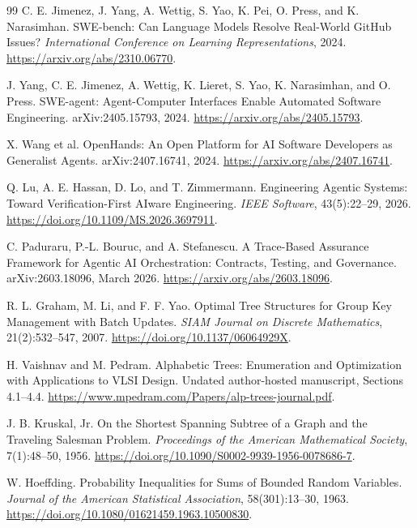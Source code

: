 \documentclass[10pt,journal,compsoc]{IEEEtran}
\theoremstyle{definition}\newtheorem{definition}[theorem]{Definition}
\begin{document}
\begin{thebibliography}{99}
\sloppy
{} C. E. Jimenez, J. Yang, A. Wettig, S. Yao, K. Pei, O. Press, and K. Narasimhan. SWE-bench: Can Language Models Resolve Real-World GitHub Issues? \emph{International Conference on Learning Representations}, 2024. \url{https://arxiv.org/abs/2310.06770}.

 J. Yang, C. E. Jimenez, A. Wettig, K. Lieret, S. Yao, K. Narasimhan, and O. Press. SWE-agent: Agent-Computer Interfaces Enable Automated Software Engineering. arXiv:2405.15793, 2024. \url{https://arxiv.org/abs/2405.15793}.

 X. Wang et al. OpenHands: An Open Platform for AI Software Developers as Generalist Agents. arXiv:2407.16741, 2024. \url{https://arxiv.org/abs/2407.16741}.

 Q. Lu, A. E. Hassan, D. Lo, and T. Zimmermann. Engineering Agentic Systems: Toward Verification-First AIware Engineering. \emph{IEEE Software}, 43(5):22--29, 2026. \url{https://doi.org/10.1109/MS.2026.3697911}.

 C. Paduraru, P.-L. Bouruc, and A. Stefanescu. A Trace-Based Assurance Framework for Agentic AI Orchestration: Contracts, Testing, and Governance. arXiv:2603.18096, March 2026. \url{https://arxiv.org/abs/2603.18096}.

 R. L. Graham, M. Li, and F. F. Yao. Optimal Tree Structures for Group Key Management with Batch Updates. \emph{SIAM Journal on Discrete Mathematics}, 21(2):532--547, 2007. \url{https://doi.org/10.1137/06064929X}.

 H. Vaishnav and M. Pedram. Alphabetic Trees: Enumeration and Optimization with Applications to VLSI Design. Undated author-hosted manuscript, Sections 4.1--4.4. \url{https://www.mpedram.com/Papers/alp-trees-journal.pdf}.

 J. B. Kruskal, Jr. On the Shortest Spanning Subtree of a Graph and the Traveling Salesman Problem. \emph{Proceedings of the American Mathematical Society}, 7(1):48--50, 1956. \url{https://doi.org/10.1090/S0002-9939-1956-0078686-7}.

 W. Hoeffding. Probability Inequalities for Sums of Bounded Random Variables. \emph{Journal of the American Statistical Association}, 58(301):13--30, 1963. \url{https://doi.org/10.1080/01621459.1963.10500830}.


\end{thebibliography}
\end{document}
